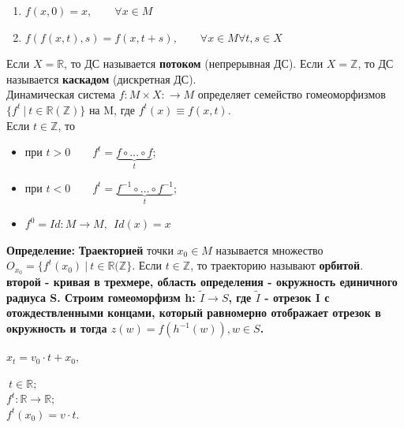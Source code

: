\documentclass[12pt,a4paper]{article}
\begin{document}
\begin{enumerate}
	\item $f(x,0) = x,\qquad \forall x \in M$
	\item $f(f(x,t),s) = f(x, t+s),\qquad \forall x \in M \forall t,s \in X$ 
\end{enumerate} 

Если $X = \mathbb{R}$, то ДС называется \textbf{потоком} (непрерывная ДС).
Если $X = \mathbb{Z}$, то ДС называется \textbf{каскадом} (дискретная ДС).\\

Динамическая система $f:M\times X: \rightarrow M$ определяет семейство гомеоморфизмов $\{ f^t~|~ t \in \mathbb{R}(\mathbb{Z}) \}$ на M, где $f^t(x) \equiv f(x,t)$. \\

Если $t \in \mathbb{Z}$, то
\begin{itemize}
	\item при $t > 0 \qquad f^t = \underbrace{f \circ \ldots \circ f}_t$;
	\item при $t < 0 \qquad f^t = \underbrace{f^{-1} \circ \ldots \circ f^{-1}}_t$;
	\item $f^0 = Id:M \rightarrow M, ~~ Id(x) = x$
\end{itemize}

\textbf{\large{Определение:}} \textbf{Траекторией} точки $x_0 \in M$ называется множество $O_{x_0} = \{f^t(x_0)~|~ t \in \mathbb{R(\mathbb{Z}} \}$. Если $t \in \mathbb{Z}$, то траекторию называют \textbf{орбитой}.\\

\textbf{второй - кривая в трехмере,  область определения - окружность единичного радиуса S. Строим гомеоморфизм h: $\tilde{I} \to S$, где $\tilde{I}$ - отрезок I с отождествленными концами, который равномерно отображает отрезок в окружность и тогда $z(w) = f(h^{-1}(w)), w\in S$.} 

$x_t = v_0\cdot t + x_0,$

$~ t\in \mathbb{R};$\\

$f^t:\mathbb{R} \rightarrow \mathbb{R};$\\

$f^t(x_0) = v\cdot t.$

	
	
	
	
\end{document}
